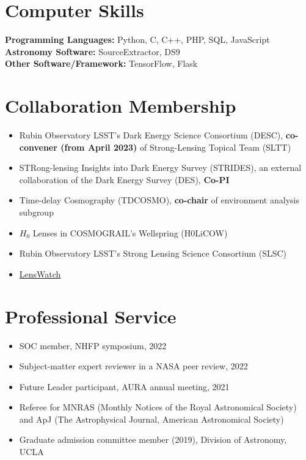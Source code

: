\documentclass[margin, line]{res}
\newenvironment{list2}{
  \begin{list}{$\bullet$}{%
      \setlength{\itemsep}{0in}
      \setlength{\parsep}{0in} \setlength{\parskip}{0in}
      \setlength{\topsep}{0in} \setlength{\partopsep}{0in} 
      \setlength{\leftmargin}{0.2in}}}{\end{list}}
\begin{document}
\begin{resume}
\section{\sc Computer Skills} 
\textbf{Programming Languages:} Python, C, C++, PHP, SQL, JavaScript \\
\textbf{Astronomy Software:} SourceExtractor, DS9 \\
\textbf{Other Software/Framework:} TensorFlow, Flask


\section{\sc Collaboration Membership}
\begin{itemize}
	\item Rubin Observatory LSST's Dark Energy Science Consortium (DESC), \textbf{co-convener (from April 2023)} of Strong-Lensing Topical Team (SLTT) 
	\item STRong-lensing Insights into Dark Energy Survey (STRIDES), an external collaboration of the Dark Energy Survey (DES), \textbf{Co-PI}
	\item Time-delay Cosmography (TDCOSMO), \textbf{co-chair} of environment analysis subgroup
	\item $H_0$ Lenses in COSMOGRAIL's Wellspring (H0LiCOW)
	\item Rubin Observatory LSST's Strong Lensing Science Consortium (SLSC)
	\item \href{https://www.lenswatch.org/}{LensWatch}
\end{itemize}

\section{\sc Professional Service}
\begin{itemize}
\item SOC member, NHFP symposium, 2022
\item Subject-matter expert reviewer in a NASA peer review, 2022
\item Future Leader participant, AURA annual meeting, 2021
\item Referee for MNRAS (Monthly Notices of the Royal Astronomical Society) and ApJ (The Astrophysical Journal, American Astronomical Society)
\item Graduate admission committee member (2019), Division of Astronomy, UCLA
\end{itemize}


\end{resume}
\end{document}
